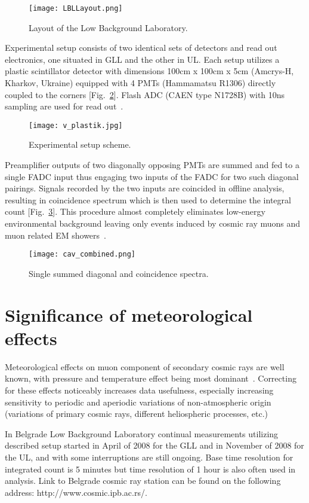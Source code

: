 \documentclass[twocolumn,twoside,slac_two]{revtex4}
\begin{document}
\begin{figure}[h]
\centering
\texttt{[image: LBLLayout.png]}
\caption{Layout of the Low Background Laboratory.} 
\label{LBL_layout}
\end{figure}

Experimental setup consists of two identical sets of detectors and read out electronics, one situated in GLL and the other in UL. Each setup utilizes a plastic scintillator detector with dimensions 100cm x 100cm x 5cm (Amcrys-H, Kharkov, Ukraine) equipped with 4 PMTs (Hammamatsu R1306) directly coupled to the corners [Fig.~\ref{Experimental_setup}]. Flash ADC (CAEN type N1728B) with 10ns sampling are used for read out~\cite{ref-1}.

\begin{figure}[h]
\centering
\texttt{[image: v\_plastik.jpg]}
\caption{Experimental setup scheme.} 
\label{Experimental_setup}
\end{figure}

Preamplifier outputs of two diagonally opposing PMTs are summed and fed to a single FADC input thus engaging two inputs of the FADC for two such diagonal pairings. Signals recorded by the two inputs are coincided in offline analysis, resulting in coincidence spectrum which is then used to determine the integral count [Fig.~\ref{Spectra}]. This procedure almost completely eliminates low-energy environmental background leaving only events induced by cosmic ray muons and muon related EM showers~\cite{ref-1}.

\begin{figure}[h]
\centering
\texttt{[image: cav\_combined.png]}
\caption{Single summed diagonal and coincidence spectra.} 
\label{Spectra}
\end{figure}

\section{Significance of meteorological effects}
Meteorological effects on muon component of secondary cosmic rays are well known, with pressure and temperature effect being most dominant~\cite{ref-2}. Correcting for these effects noticeably increases data usefulness, especially increasing sensitivity to periodic and aperiodic variations of non-atmospheric origin (variations of primary cosmic rays, different heliospheric processes, etc.)

In Belgrade Low Background Laboratory continual measurements utilizing described setup started in April of 2008 for the GLL and in November of 2008 for the UL, and with some interruptions are still ongoing. Base time resolution for integrated count is 5 minutes but time resolution of 1 hour is also often used in analysis. Link to Belgrade cosmic ray station can be found on the following address: http://www.cosmic.ipb.ac.rs/.
\end{document}
